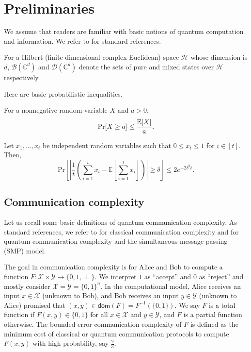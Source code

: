 \section{Preliminaries}\label{sec:prel}

We assume that readers are familiar with basic notions of quantum computation and information. We refer to \cite{NC10,Wat18,dW19} for standard references.

For a Hilbert (finite-dimensional complex Euclidean) space $\mathcal{H}$ whose dimension is $d$, $\mathcal{B}(\mathbb{C}^d)$ and $\mathcal{D}(\mathbb{C}^d)$ denote the sets of pure and mixed states over $\mathcal{H}$ respectively.

Here are basic probabilistic inequalities.

\begin{fact}\label{fact:markov}
    For a nonnegative random variable $X$ and $a>0$,
    \[
        \Pr[X \geq a] \leq \frac{\mathbb{E}[X]}{a}.
    \]
\end{fact}
\begin{fact}\label{fact:hoeffding}
    Let $x_1,\ldots,x_t$ be independent random variables such that $0 \leq x_i \leq 1$ for $i \in [t]$. Then,
    \[
        \mathrm{Pr}\left[ \left| \frac{1}{t} \left(\sum_{i=1}^t x_i - \mathbb{E} \left[ \sum_{i=1}^t x_i \right] \right) \right| \geq \delta \right] \leq 2e^{-2 \delta^2 t}.
    \]
\end{fact}

\subsection{Communication complexity}
Let us recall some basic definitions of quantum communication complexity. As standard references, we refer to \cite{KN96,RY20} for classical communication complexity and \cite{BCMdW10} for quantum communication complexity and the simultaneous message passing (SMP) model.

The goal in communication complexity is for Alice and Bob to compute a function $F : \mathcal{X} \times \mathcal{Y} \to \{0,1,\perp\}$. We interpret $1$ as ``accept'' and $0$ as ``reject'' and mostly consider $\mathcal{X}=\mathcal{Y}=\{0,1\}^n$. In the computational model, Alice receives an input $x \in \mathcal{X}$ (unknown to Bob), and Bob receives an input $y \in \mathcal{Y}$ (unknown to Alice) promised that $(x,y) \in \mathsf{dom}(F)=F^{-1}(\{0,1\})$. We say $F$ is a total function if $F(x,y) \in \{0,1\}$ for all $x \in \mathcal{X}$ and $y \in \mathcal{Y}$, and $F$ is a partial function otherwise. The bounded error communication complexity of $F$ is defined as the minimum cost of classical or quantum communication protocols to compute $F(x,y)$ with high probability, say $\frac{2}{3}$.

